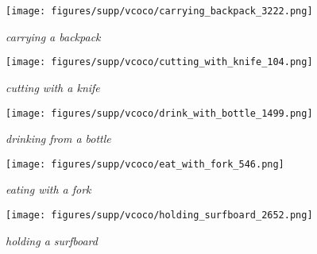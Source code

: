 \documentclass[10pt,twocolumn,letterpaper]{article}
\begin{document}
\begin{figure*}
\begin{subfigure}[t]{0.19\linewidth}
        \centering
        \texttt{[image: figures/supp/vcoco/carrying\_backpack\_3222.png]}
        \caption{\textit{carrying a backpack}}
        \label{fig:vcoco-carrying-backpack}
    \end{subfigure}
    \hfill \begin{subfigure}[t]{0.19\linewidth}
        \centering
        \texttt{[image: figures/supp/vcoco/cutting\_with\_knife\_104.png]}
        \caption{\textit{cutting with a knife}}
        \label{fig:vcoco-cutting-knife}
    \end{subfigure}
    \begin{subfigure}[t]{0.19\linewidth}
        \centering
        \texttt{[image: figures/supp/vcoco/drink\_with\_bottle\_1499.png]}
        \caption{\textit{drinking from a bottle}}
        \label{fig:vcoco-drinking-bottle}
    \end{subfigure}
    \hfill \begin{subfigure}[t]{0.19\linewidth}
        \centering
        \texttt{[image: figures/supp/vcoco/eat\_with\_fork\_546.png]}
        \caption{\textit{eating with a fork}}
        \label{fig:vcoco-eating-fork}
    \end{subfigure}
    \hfill \begin{subfigure}[t]{0.19\linewidth}
        \centering
        \texttt{[image: figures/supp/vcoco/holding\_surfboard\_2652.png]}
        \caption{\textit{holding a surfboard}}
        \label{fig:vcoco-holding-surfboard}
    \end{subfigure}


\end{figure*}
\end{document}
